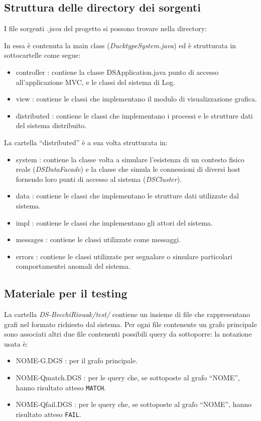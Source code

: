 \subsection{Struttura delle directory dei sorgenti}
I file sorgenti \emph{.java} del progetto si possono trovare nella directory:


In essa è contenuta la main class (\emph{DucktypeSystem.java})
ed è strutturata in sottocartelle come segue:
\begin{itemize}
\item controller : contiene la classe DSApplication.java punto di accesso
  all'applicazione MVC, e le classi del sistema di Log.
\item view : contiene le classi che implementano il modulo di visualizzazione grafica.
\item distributed : contiene le classi che implementano i processi e le strutture
  dati del sistema distribuito.
\end{itemize}

La cartella ``distributed'' è a sua volta strutturata in:
\begin{itemize}
\item system : contiene la classe volta a simulare l'esistenza di un
  contesto fisico reale (\emph{DSDataFacade})
  e la classe che simula le connessioni di diversi host
  fornendo loro punti di accesso al sistema (\emph{DSCluster}).
\item data : contiene le classi che implementano le strutture dati
  utilizzate dal sistema.
\item impl : contiene le classi che implementano gli attori del sistema.
\item messages : contiene le classi utilizzate come messaggi.
\item errors : contiene le classi utilizzate per segnalare o simulare
  particolari comportamentei anomali del sistema.
\end{itemize}

\subsection{Materiale per il testing}
La cartella \emph{DS-BecchiRiouak/test/} contiene un insieme di file che
rappresentano grafi nel formato richiesto dal sistema.
Per ogni file contenente un grafo principale sono associati
altri due file contenenti possibili query da sottoporre: la notazione
usata è:
\begin{itemize}
\item NOME-G.DGS : per il grafo principale.
\item NOME-Qmatch.DGS : per le query che, se sottoposte al grafo ``NOME'',
  hanno risultato atteso \texttt{MATCH}.
\item NOME-Qfail.DGS : per le query che, se sottoposte al grafo ``NOME'',
  hanno risultato atteso \texttt{FAIL}.
\end{itemize}

